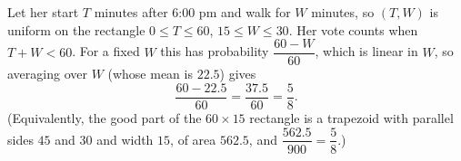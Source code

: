 Let her start $T$ minutes after 6:00 pm and walk for $W$ minutes, so $(T,W)$ is uniform on the rectangle $0\le T\le60$, $15\le W\le30$. Her vote counts when $T+W<60$. For a fixed $W$ this has probability $\dfrac{60-W}{60}$, which is linear in $W$, so averaging over $W$ (whose mean is $22.5$) gives
\[\dfrac{60-22.5}{60}=\dfrac{37.5}{60}=\boxed{\dfrac58}.\]
(Equivalently, the good part of the $60\times15$ rectangle is a trapezoid with parallel sides $45$ and $30$ and width $15$, of area $562.5$, and $\dfrac{562.5}{900}=\dfrac58$.)
